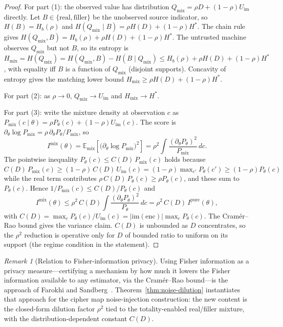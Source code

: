 \documentclass[conference]{IEEEtran}
\theoremstyle{definition}
\theoremstyle{plain}
\theoremstyle{remark}
\newtheorem{remark}{Remark}[section]
\newcommand{\enc}{\mathrm{enc}}
\begin{document}
\begin{proof}
For part (1): the observed value has distribution
$Q_{\mathrm{mix}} = \rho D + (1-\rho) U_{\mathrm{im}}$ directly.  Let
$B \in \{\text{real},\text{filler}\}$ be the unobserved source indicator,
so $H(B) = H_b(\rho)$ and
$H(Q_{\mathrm{mix}} \mid B) = \rho H(D) + (1-\rho) H^*$.  The chain rule
gives $H(Q_{\mathrm{mix}}, B) = H_b(\rho) + \rho H(D) + (1-\rho) H^*$.
The untrusted machine observes $Q_{\mathrm{mix}}$ but not $B$, so its
entropy is $H_{\mathrm{mix}} = H(Q_{\mathrm{mix}}) = H(Q_{\mathrm{mix}}, B)
- H(B \mid Q_{\mathrm{mix}}) \leq H_b(\rho) + \rho H(D) + (1-\rho) H^*$,
with equality iff $B$ is a function of $Q_{\mathrm{mix}}$ (disjoint
supports).  Concavity of entropy gives the matching lower bound
$H_{\mathrm{mix}} \geq \rho H(D) + (1-\rho) H^*$.

For part (2): as $\rho \to 0$, $Q_{\mathrm{mix}} \to U_{\mathrm{im}}$ and
$H_{\mathrm{mix}} \to H^*$.

For part (3): write the mixture density at observation $c$ as
$P_{\mathrm{mix}}(c \mid \theta) = \rho P_\theta(c) +
(1 - \rho) U_{\mathrm{im}}(c)$.  The score is
$\partial_\theta \log P_{\mathrm{mix}} =
\rho\,\partial_\theta P_\theta / P_{\mathrm{mix}}$, so
\[
I^{\mathrm{mix}}(\theta)
  = \mathbb{E}_{\mathrm{mix}}\!\left[\bigl(\partial_\theta \log P_{\mathrm{mix}}\bigr)^2\right]
  = \rho^2 \int \frac{(\partial_\theta P_\theta)^2}{P_{\mathrm{mix}}}\,dc.
\]
The pointwise inequality $P_\theta(c) \leq C(D)\,P_{\mathrm{mix}}(c)$
holds because $C(D)\,P_{\mathrm{mix}}(c) \geq (1-\rho)\,C(D)\,
U_{\mathrm{im}}(c) = (1-\rho)\max_{c'} P_\theta(c') \geq (1-\rho)
P_\theta(c)$ while the real term contributes
$\rho\,C(D)\,P_\theta(c) \geq \rho P_\theta(c)$, and these sum to
$P_\theta(c)$.  Hence $1/P_{\mathrm{mix}}(c) \leq C(D)/P_\theta(c)$ and
\[
I^{\mathrm{mix}}(\theta)
  \leq \rho^2\,C(D) \int \frac{(\partial_\theta P_\theta)^2}{P_\theta}\,dc
  = \rho^2\,C(D)\,I^{\mathrm{pure}}(\theta),
\]
with $C(D) = \max_c P_\theta(c) / U_{\mathrm{im}}(c) =
|\mathrm{im}(\enc)| \max_c P_\theta(c)$.  The Cram\'er--Rao bound gives
the variance claim.  $C(D)$ is unbounded as $D$ concentrates, so the
$\rho^2$ reduction is operative only for $D$ of bounded ratio to uniform
on its support (the regime condition in the statement).
\end{proof}

\begin{remark}[Relation to Fisher-information privacy]
Using Fisher information as a privacy measure---certifying a mechanism by
how much it lowers the Fisher information available to any estimator, via
the Cram\'er--Rao bound---is the approach of Farokhi and
Sandberg~\cite{farokhi2019ensuring}.  Theorem~\ref{thm:noise-dilution}
instantiates that approach for the cipher map noise-injection construction:
the new content is the closed-form dilution factor $\rho^2$ tied to the
totality-enabled real/filler mixture, with the distribution-dependent
constant $C(D)$.
\end{remark}
\end{document}
